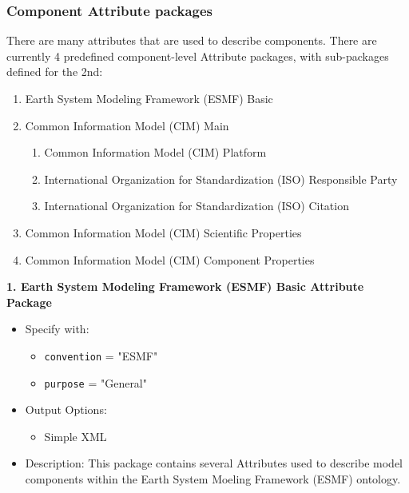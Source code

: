 \subsubsection{Component Attribute packages}
\label{ComponentAttributePackages}

There are many attributes that are used to describe components. There are currently 4 predefined component-level Attribute packages, with sub-packages defined for the 2nd:

\begin{enumerate}
    \item Earth System Modeling Framework (ESMF) Basic
    \item Common Information Model (CIM) Main
    \begin{enumerate}
        \item Common Information Model (CIM) Platform
        \item International Organization for Standardization (ISO) Responsible Party
        \item International Organization for Standardization (ISO) Citation
    \end{enumerate}
    \item Common Information Model (CIM) Scientific Properties
    \item Common Information Model (CIM) Component Properties
\end{enumerate}

\vspace{.20in}

{\bf 1. Earth System Modeling Framework (ESMF) Basic Attribute Package}

\begin{itemize}
    \item Specify with:
    \begin{itemize}
        \item {\tt convention} = "ESMF"
        \item {\tt purpose} = "General"
    \end{itemize}
    \item Output Options:
    \begin{itemize}
        \item Simple XML
    \end{itemize} 
    \item Description: This package contains several Attributes used to describe model components within the Earth System Moeling Framework (ESMF) ontology. 
\end{itemize}


